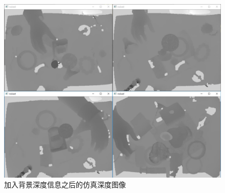 \begin{figure}[htb]
	\centering 
	\includegraphics[width=\textwidth]{./mypic/加入背景深度信息之后的仿真深度图像.jpg} 
	\caption{加入背景深度信息之后的仿真深度图像} 
\end{figure}

